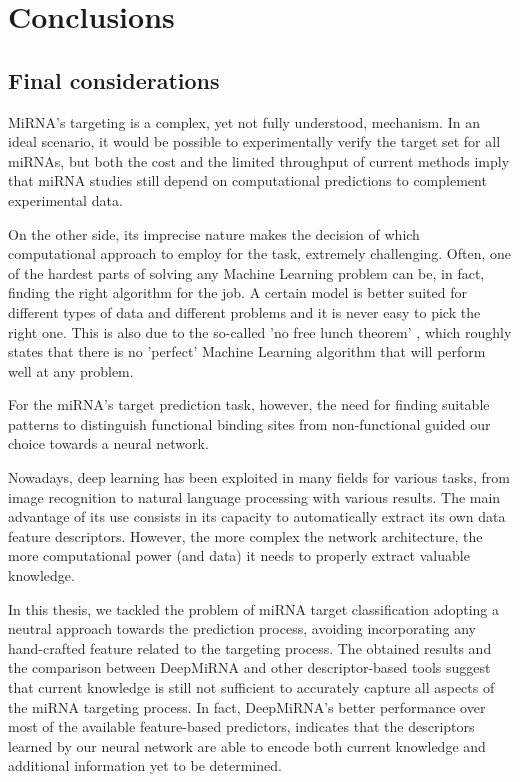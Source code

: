 
\chapter{Conclusions} %

\label{Chapter7} %

\section{Final considerations}
MiRNA's targeting is a complex, yet not fully understood, mechanism. In an ideal scenario, it would be possible to experimentally verify the target set for all miRNAs, but both the cost and the limited throughput of current methods imply that miRNA studies still depend on computational predictions to complement experimental data.

On the other side, its imprecise nature makes the decision of which computational approach to employ for the task, extremely challenging. Often, one of the hardest parts of solving any Machine Learning problem can be, in fact, finding the right algorithm for the job. A certain model is better suited for different types of data and different problems and it is never easy to pick the right one. This is also due to the so-called 'no free lunch theorem' \cite{nfl}, which roughly states that there is no 'perfect' Machine Learning algorithm that will perform well at any problem.

For the miRNA's target prediction task, however, the need for finding suitable patterns to distinguish functional binding sites from non-functional guided our choice towards a neural network. 

Nowadays, deep learning has been exploited in many fields for various tasks, from image recognition to natural language processing with various results. The main advantage of its use consists in its capacity to automatically extract its own data feature descriptors. However, the more complex the network architecture, the more computational power (and data) it needs to properly extract valuable knowledge.

In this thesis, we tackled the problem of miRNA target classification adopting a neutral approach towards the prediction process, avoiding incorporating any hand-crafted feature related to the targeting process. The obtained results and the comparison between DeepMiRNA and other descriptor-based tools suggest that current knowledge is still not sufficient to accurately capture all aspects of the miRNA targeting process. In fact, DeepMiRNA's better performance over most of the available feature-based predictors, indicates that the descriptors learned by our neural network are able to encode both current knowledge and additional information yet to be determined.   

